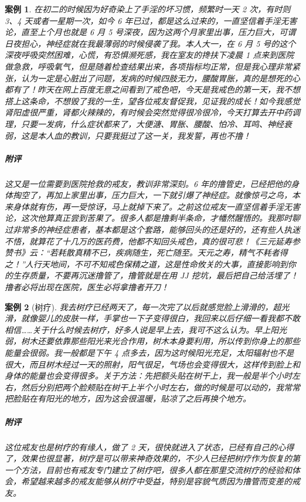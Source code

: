 \documentclass{ctexart}
\newtheorem{case}{案例}
\begin{document}
\begin{case}
    在初二的时候因为好奇染上了手淫的坏习惯，频繁时一天 2 次，有时则 3、4 天或者一星期一次，如今 6 年已过，都是这么过来的，一直坚信着手淫无害论，直至上个月也就是 6 月 5 号深夜，因为这两个月家里出事，压力巨大，可谓日夜担心，神经症就在我最薄弱的时候侵袭了我。本人大一，在 6 月 5 号的这个深夜呼吸突然困难，心慌，有恐惧濒死感，我在室友的搀扶下凌晨 1 点来到医院做急救，呼吸氧气，但是随着检查结果出来，各项指标均正常，但是我心理非常紧张，认为一定是心脏出了问题，发病的时候四肢无力，腰酸胃胀，真的是想死的心都有了！昨天在网上百度无意之间看到了戒色吧，今天是我戒色的第一天，我不想搭上这条命，不想毁了我的一生，望各位戒友督促我，见证我的成长！如今我感觉肾阳虚很严重，肾都火辣辣的，有时候会突然觉得很冷很冷，今天打算去开中药调理，只要一发病，什么症状都来了，大便溏、胃胀、腰酸、怕冷、耳鸣、神经衰弱，这是本人血的教训，只要我挺过了这一关，我发誓，再也不撸！
    \subparagraph{附评} 这又是一位需要到医院抢救的戒友，教训非常深刻。6 年的撸管史，已经把他的身体掏空了，再加上家里出事，压力巨大，一下就引爆了神经症。就像惊弓之鸟，本来身体就有伤，再一受惊讶，马上就掉下来了。之前这位戒友一直坚信着手淫无害论，这次他算真正尝到苦果了。很多人都是撸剩半条命，才幡然醒悟的。我那时聊过非常多的神经症患者，基本都是这个套路，能够回头的还是好的，还有些人执迷不悟，就算花了十几万的医药费，他都不知回头戒色，真的很可悲！《三元延寿参赞书》云：“若耗散真精不已，疾病随生，死亡随至。天元之寿，精气不耗者得之！”人行天地间，不可不知戒色保精之道，这是性命攸关的大事，直接影响到你的生存质量，不要再沉迷撸管了，撸管就是在用 JJ 挖坑，最后把自己给活埋了！撸者必将出现在医院，医生必将拿撸者开刀！
\end{case}

\begin{case}[树疗]
    我去树疗已经两天了，每一次完了以后就感觉脸上滑滑的，超光滑，就像婴儿的皮肤一样，手掌也一下子变得很白，我回来以后仔细一看我都不敢相信……关于什么时候去树疗，好多人说是早上去，我可不这么认为。早上阳光弱，树木还要依靠那些阳光来光合作用，树木本身要利用，所以传到你身上的那些能量会很弱。我一般都是下午 4 点多去，因为这时候阳光充足，太阳辐射也不是很大，而且树木经过一天的照射，阳气很足，气场也会变得很大，这样传到脸上和身体的能量也会变得很多。关于方法：先把额头贴在树干上，我一般是半个小时左右，然后分别把两个脸颊贴在树干上半个小时左右，做的时候是可以动的，我常常把脸贴在有阳光的地方，因为这会很温暖，贴凉了之后再换个地方。
    \subparagraph{附评} 这位戒友也是树疗的有缘人，做了 2 天，很快就进入了状态，已经有自己的心得了，效果也很显著，树疗是可以带来神奇效果的，不少人已经把树疗作为恢复的第一个方法，目前也有戒友专门建立了树疗吧，很多人都在那里交流树疗的经验和体会，希望越来越多的戒友能够从树疗中受益，特别是容貌气质因为撸管而变差的戒友。
\end{case}
\end{document}
